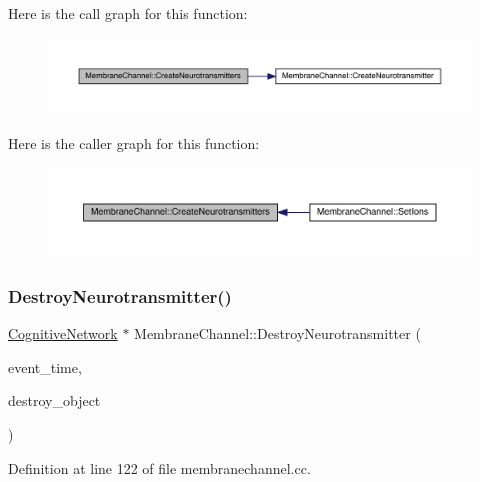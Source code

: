 Here is the call graph for this function\+:\nopagebreak
\begin{figure}[H]
\begin{center}
\leavevmode
\includegraphics[width=350pt]{class_membrane_channel_a24c791e6cfd906d49e0ceb8a24eeb4cb_cgraph}
\end{center}
\end{figure}
Here is the caller graph for this function\+:\nopagebreak
\begin{figure}[H]
\begin{center}
\leavevmode
\includegraphics[width=350pt]{class_membrane_channel_a24c791e6cfd906d49e0ceb8a24eeb4cb_icgraph}
\end{center}
\end{figure}
\mbox{\label{class_membrane_channel_a985d8f93077b0f93daa9c311a22917a1}} 
\subsubsection{\texorpdfstring{Destroy\+Neurotransmitter()}{DestroyNeurotransmitter()}}
{\footnotesize\ttfamily \hyperlink{class_cognitive_network}{Cognitive\+Network} $\ast$ Membrane\+Channel\+::\+Destroy\+Neurotransmitter (\begin{DoxyParamCaption}\item[{std\+::chrono\+::time\+\_\+point$<$ \hyperlink{universe_8h_a0ef8d951d1ca5ab3cfaf7ab4c7a6fd80}{Clock} $>$}]{event\+\_\+time,  }\item[{\hyperlink{class_cognitive_network}{Cognitive\+Network} $\ast$}]{destroy\+\_\+object }\end{DoxyParamCaption})}



Definition at line 122 of file membranechannel.\+cc.

